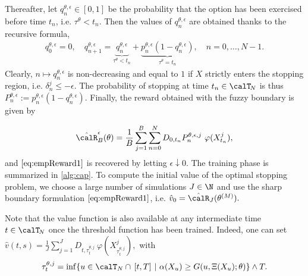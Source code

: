 Thereafter, let $q^{\theta,\epsilon}_{n} \in [0,1]$ be the probability that the option has been exercised before time $t_n$, i.e. $\tau^{\theta} < t_n$. Then the values of $q^{\theta,\epsilon}_{n}$  are obtained thanks to the recursive formula, 
\begin{align}\label{eq:recStop}
     q^{\theta,\epsilon}_{0} = 0, \quad 
     q^{\theta,\epsilon}_{n+1}
     = \underbrace{q^{\theta,\epsilon}_{n}}_{ \tau^{\theta} < t_n} + \underbrace{p^{\theta,\epsilon}_{n}(1-q^{\theta,\epsilon}_{n})}_{\tau^{\theta} = t_n}, \quad n = 0, \ldots, N-1. 
\end{align}
Clearly, $n \mapsto q^{\theta,\epsilon}_{n}$ is non-decreasing and equal to $1$ if $X$ strictly enters the stopping region, i.e.  $\delta^j_n \le -\epsilon$.   
The probability of stopping at time $t_n \in \calT_{\!N}$  is thus $P^{\theta,\epsilon}_{n} := p^{\theta,\epsilon}_{n}(1-q^{\theta,\epsilon}_{n})$. Finally,  the  reward obtained with the  fuzzy boundary is given by 

\begin{equation}\label{eq:empReward2}
\hat{\calR}_B^{\epsilon}(\theta) =  \frac{1}{B}\sum_{j=1}^B  \sum_{n=0}^N D_{0,t_n}   P^{\theta,\epsilon,j}_{n}\ \varphi(X_{t_n}^j),
\end{equation}
and $\eqref{eq:empReward1}$ is recovered by letting $\epsilon  \downarrow 0$. 
The training phase is summarized in \cref{alg:cap}. To compute the initial value of the optimal stopping problem, we choose a large number of simulations $J\in \N$ and use the sharp boundary formulation $\eqref{eq:empReward1}$, i.e.   
$ \hat{v}_0 = \hat{\calR}_J(\theta^{(M)}) .$ 
 \begin{remark}
 Note that the value function is also  available at any intermediate time $t\in \calT_{\!N}$ once the threshold function has been trained. Indeed, one  can set 
 $\hat{v}(t,s) = \frac{1}{J}\sum_{j=1}^J   D_{t,\tau_t^{\theta,j}}  \ \varphi(X_{\tau_t^{\theta,j}}^j),$ 
 with $$\tau_t^{\theta,j} = \inf\{u \in \calT_{N} \cap \, [t,T]\ | \ \alpha(X_u) \ge G(u,\Xi(X_u); \theta) \} \wedge T.$$
 \end{remark}
 
